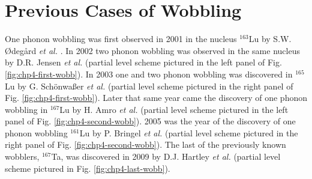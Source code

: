 \section{Previous Cases of Wobbling}
\label{sec:trw-prev}
One phonon wobbling was first observed in 2001 in the nucleus $^{163}$Lu by S.W. \O{}deg\aa{}rd \emph{et al.} \cite{wobblingIn163Lu}. In 2002 two phonon wobbling was observed in the same nucleus by D.R. Jensen \emph{et al.} \cite{wobblingIn163LuTwoPhonon} (partial level scheme pictured in the left panel of Fig. \ref{fig:chp4-first-wobb}). In 2003 one and two phonon wobbling was discovered in $^{165}$Lu by G. Sch\"onwa\ss{}er \emph{et al.} \cite{wobblingIn165Lu} (partial level scheme pictured in the right panel of Fig. \ref{fig:chp4-first-wobb}). Later that same year came the discovery of one phonon wobbling in $^{167}$Lu by H. Amro \emph{et al.} \cite{wobblingIn167Lu} (partial level scheme pictured in the left panel of Fig. \ref{fig:chp4-second-wobb}). 2005 was the year of the discovery of one phonon wobbling  $^{161}$Lu by P. Bringel \emph{et al.} \cite{wobblingIn161Lu} (partial level scheme pictured in the right panel of Fig. \ref{fig:chp4-second-wobb}). The last of the previously known wobblers, $^{167}$Ta, was discovered in 2009 by D.J. Hartley \emph{et al.} \cite{wobblingIn167Ta} (partial level scheme pictured in Fig. \ref{fig:chp4-last-wobb}). 

